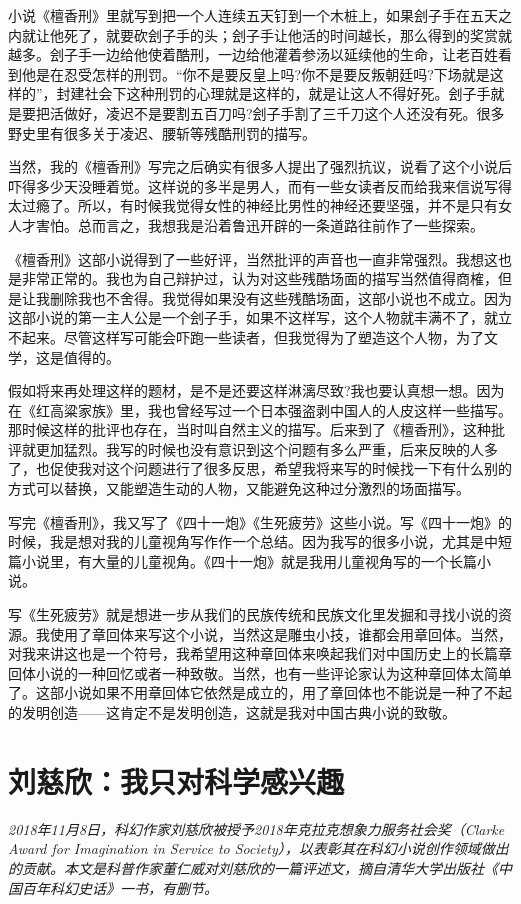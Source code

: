 \documentclass[fontset=fandol,12pt,a5paper]{ctexbook}
\begin{document}
小说《檀香刑》里就写到把一个人连续五天钉到一个木桩上，如果刽子手在五天之内就让他死了，就要砍刽子手的头；刽子手让他活的时间越长，那么得到的奖赏就越多。刽子手一边给他使着酷刑，一边给他灌着参汤以延续他的生命，让老百姓看到他是在忍受怎样的刑罚。“你不是要反皇上吗?你不是要反叛朝廷吗?下场就是这样的”，封建社会下这种刑罚的心理就是这样的，就是让这人不得好死。刽子手就是要把活做好，凌迟不是要割五百刀吗?刽子手割了三千刀这个人还没有死。很多野史里有很多关于凌迟、腰斩等残酷刑罚的描写。

当然，我的《檀香刑》写完之后确实有很多人提出了强烈抗议，说看了这个小说后吓得多少天没睡着觉。这样说的多半是男人，而有一些女读者反而给我来信说写得太过瘾了。所以，有时候我觉得女性的神经比男性的神经还要坚强，并不是只有女人才害怕。总而言之，我想我是沿着鲁迅开辟的一条道路往前作了一些探索。

《檀香刑》这部小说得到了一些好评，当然批评的声音也一直非常强烈。我想这也是非常正常的。我也为自己辩护过，认为对这些残酷场面的描写当然值得商榷，但是让我删除我也不舍得。我觉得如果没有这些残酷场面，这部小说也不成立。因为这部小说的第一主人公是一个刽子手，如果不这样写，这个人物就丰满不了，就立不起来。尽管这样写可能会吓跑一些读者，但我觉得为了塑造这个人物，为了文学，这是值得的。

假如将来再处理这样的题材，是不是还要这样淋漓尽致?我也要认真想一想。因为在《红高粱家族》里，我也曾经写过一个日本强盗剥中国人的人皮这样一些描写。那时候这样的批评也存在，当时叫自然主义的描写。后来到了《檀香刑》，这种批评就更加猛烈。我写的时候也没有意识到这个问题有多么严重，后来反映的人多了，也促使我对这个问题进行了很多反思，希望我将来写的时候找一下有什么别的方式可以替换，又能塑造生动的人物，又能避免这种过分激烈的场面描写。

写完《檀香刑》，我又写了《四十一炮》《生死疲劳》这些小说。写《四十一炮》的时候，我是想对我的儿童视角写作作一个总结。因为我写的很多小说，尤其是中短篇小说里，有大量的儿童视角。《四十一炮》就是我用儿童视角写的一个长篇小说。

写《生死疲劳》就是想进一步从我们的民族传统和民族文化里发掘和寻找小说的资源。我使用了章回体来写这个小说，当然这是雕虫小技，谁都会用章回体。当然，对我来讲这也是一个符号，我希望用这种章回体来唤起我们对中国历史上的长篇章回体小说的一种回忆或者一种致敬。当然，也有一些评论家认为这种章回体太简单了。这部小说如果不用章回体它依然是成立的，用了章回体也不能说是一种了不起的发明创造——这肯定不是发明创造，这就是我对中国古典小说的致敬。

\newpage

\section{刘慈欣：我只对科学感兴趣}
\emph{2018年11月8日，科幻作家刘慈欣被授予2018年克拉克想象力服务社会奖（Clarke Award for Imagination in Service to Society），以表彰其在科幻小说创作领域做出的贡献。本文是科普作家董仁威对刘慈欣的一篇评述文，摘自清华大学出版社《中国百年科幻史话》一书，有删节。}
\vspace{2em}
\end{document}
